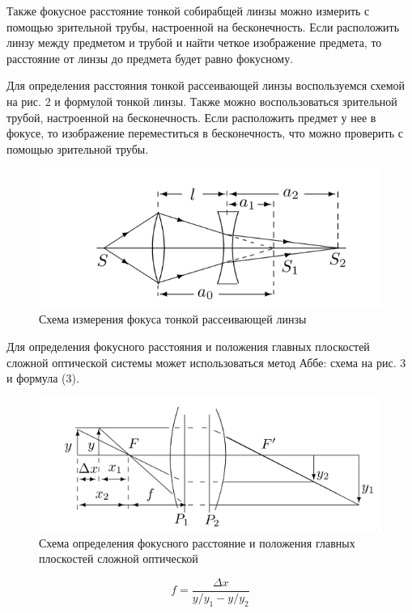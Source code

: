\documentclass[a4paper,12pt]{article}
\begin{document}
\noindent
Также фокусное расстояние тонкой собирабщей линзы можно измерить с помощью зрительной трубы, настроенной на бесконечность. Если расположить линзу между предметом и трубой и найти четкое изображение предмета, то расстояние от линзы до предмета будет равно фокусному.

\noindent
Для определения расстояния тонкой рассеивающей линзы воспользуемся схемой на рис. 2 и формулой тонкой линзы. Также можно воспользоваться зрительной трубой, настроенной на бесконечность. Если расположить предмет у нее в фокусе, то изображение переместиться в бесконечность, что можно проверить с помощью зрительной трубы.

\begin{figure}[H]
    \centering
    \includegraphics[scale=0.7]{pic2.png}
    \caption{Схема измерения фокуса тонкой рассеивающей линзы}
\end{figure}

\noindent
Для определения фокусного расстояния и положения главных плоскостей сложной оптической системы может использоваться метод Аббе: схема на рис. 3 и формула (3).

\begin{figure}[H]
    \centering
    \includegraphics[scale=0.7]{pic3.png}
    \caption{Схема определения фокусного расстояние и положения главных плоскостей сложной оптической}
\end{figure}

\begin{equation}
    f = \frac{\Delta x}{y / y_1 - y / y_2}    
\end{equation}
\end{document}
